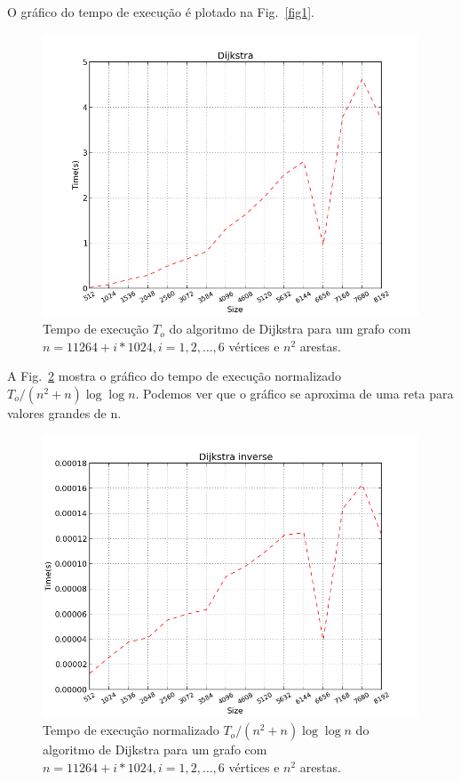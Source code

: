 \documentclass{article}
\begin{document}
O gráfico do tempo de execução é plotado na Fig.~\ref{fig1}.

\begin{figure}
  \centering
  \includegraphics[width=\textwidth,keepaspectratio]{dij2.png}
  \caption{Tempo de execução $T_o$ do algoritmo de Dijkstra para um grafo com $n=11264 + i * 1024, i = 1, 2, \ldots, 6$ vértices e $n ^ 2$ arestas.}
  \label{fig3}
\end{figure}

A Fig.~\ref{fig4} mostra o gráfico do tempo de execução normalizado $T_o/(n^2+n)\log\log n$. Podemos ver que o gráfico se aproxima de uma reta para valores grandes de n.
\begin{figure}
  \centering
  \includegraphics[width=\textwidth,keepaspectratio]{dij_inv2.png}
  \caption{Tempo de execução normalizado $T_o/(n^2+n)\log\log n$ do algoritmo de Dijkstra para um grafo com $n=11264 + i * 1024, i = 1, 2, \ldots, 6$ vértices e $n ^ 2$ arestas.}
  \label{fig4}
\end{figure}
\end{document}
